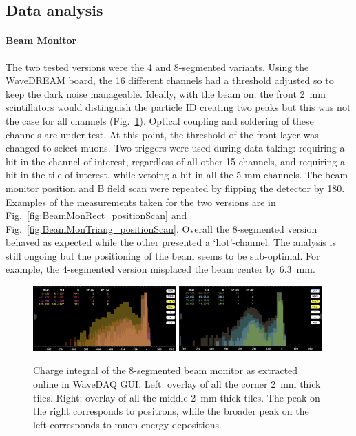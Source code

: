 \begin{refsection}
    \subsection{Data analysis}
        \paragraph{Beam Monitor}
        The two tested versions were the 4 and 8-segmented variants.
        Using the WaveDREAM board, the 16 different channels had a threshold adjusted so to keep the dark noise manageable.
        Ideally, with the beam on, the front \SI{2}{mm} scintillators would distinguish the particle ID creating two peaks but this was not the case for all channels (Fig.~\ref{fig:BeamMonRect_pulsesDefaultThresh}). 
        Optical coupling and soldering of these channels are under test.
        At this point, the threshold of the front layer was changed to select muons.
        Two triggers were used during data-taking: requiring a hit in the channel of interest, regardless of all other 15 channels, and requiring a hit in the tile of interest, while vetoing a hit in all the 5 mm channels.
        The beam monitor position and B field scan were repeated by flipping the detector by \SI{180}{\deg}.
        Examples of the measurements taken for the two versions are in Fig.~\ref{fig:BeamMonRect_positionScan} and Fig.~\ref{fig:BeamMonTriang_positionScan}. 
        Overall the 8-segmented version behaved as expected while the other presented a `hot'-channel.
        The analysis is still ongoing but the positioning of the beam seems to be sub-optimal. 
        For example, the 4-segmented version misplaced the beam center by \SI{6.3}{mm}.


        \begin{figure}
            \centering
            \includegraphics[width=0.49\textwidth]{Figures/muEDM_Dec2023/Corner_overlay_TueHVset_rect.png}
            \includegraphics[width=0.49\textwidth]{Figures/muEDM_Dec2023/Middle_overlay_TueHVset_rect.png}
            \caption{Charge integral of the 8-segmented beam monitor as extracted online in WaveDAQ GUI. Left: overlay of all the corner 2~mm thick tiles. Right: overlay of all the middle 2~mm thick tiles. The peak on the right corresponds to positrons, while the broader peak on the left corresponds to muon energy depositions.}
            \label{fig:BeamMonRect_pulsesDefaultThresh}
        \end{figure}
        

\end{refsection}
